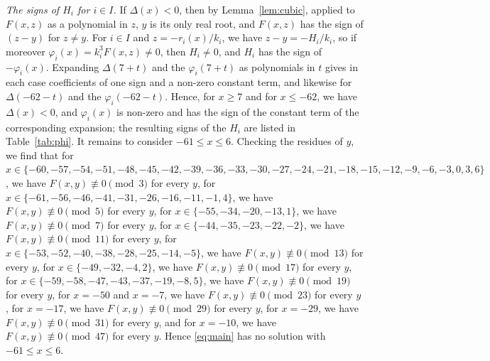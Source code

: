 \documentclass[11pt]{article}
\begin{document}
\emph{The signs of $H_i$ for $i\in I$.} If $\Delta(x)<0$, then by Lemma~\ref{lem:cubic}, applied to $F(x,z)$ as a polynomial in $z$, $y$ is its only real root, and $F(x,z)$ has the sign of $(z-y)$ for $z\neq y$. For $i\in I$ and $z=-r_i(x)/k_i$, we have $z-y=-H_i/k_i$, so if moreover $\varphi_i(x)=k_i^3F(x,z)\neq0$, then $H_i\neq0$, and $H_i$ has the sign of $-\varphi_i(x)$. Expanding $\Delta(7+t)$ and the $\varphi_i(7+t)$ as polynomials in $t$ gives in each case coefficients of one sign and a non-zero constant term, and likewise for $\Delta(-62-t)$ and the $\varphi_i(-62-t)$. Hence, for $x\geq7$ and for $x\leq-62$, we have $\Delta(x)<0$, and $\varphi_i(x)$ is non-zero and has the sign of the constant term of the corresponding expansion; the resulting signs of the $H_i$ are listed in Table~\ref{tab:phi}. It remains to consider $-61\leq x\leq6$. Checking the residues of $y$, we find that for $x\in\{-60,\allowbreak -57,\allowbreak -54,\allowbreak -51,\allowbreak -48,\allowbreak -45,\allowbreak -42,\allowbreak -39,\allowbreak -36,\allowbreak -33,\allowbreak -30,\allowbreak -27,\allowbreak -24,\allowbreak -21,\allowbreak -18,\allowbreak -15,\allowbreak -12,\allowbreak -9,\allowbreak -6,\allowbreak -3,\allowbreak 0,\allowbreak 3,\allowbreak 6\}$, we have $F(x,y)\not\equiv0\pmod{3}$ for every $y$, for $x\in\{-61,\allowbreak -56,\allowbreak -46,\allowbreak -41,\allowbreak -31,\allowbreak -26,\allowbreak -16,\allowbreak -11,\allowbreak -1,\allowbreak 4\}$, we have $F(x,y)\not\equiv0\pmod{5}$ for every $y$, for $x\in\{-55,\allowbreak -34,\allowbreak -20,\allowbreak -13,\allowbreak 1\}$, we have $F(x,y)\not\equiv0\pmod{7}$ for every $y$, for $x\in\{-44,\allowbreak -35,\allowbreak -23,\allowbreak -22,\allowbreak -2\}$, we have $F(x,y)\not\equiv0\pmod{11}$ for every $y$, for $x\in\{-53,\allowbreak -52,\allowbreak -40,\allowbreak -38,\allowbreak -28,\allowbreak -25,\allowbreak -14,\allowbreak -5\}$, we have $F(x,y)\not\equiv0\pmod{13}$ for every $y$, for $x\in\{-49,\allowbreak -32,\allowbreak -4,\allowbreak 2\}$, we have $F(x,y)\not\equiv0\pmod{17}$ for every $y$, for $x\in\{-59,\allowbreak -58,\allowbreak -47,\allowbreak -43,\allowbreak -37,\allowbreak -19,\allowbreak -8,\allowbreak 5\}$, we have $F(x,y)\not\equiv0\pmod{19}$ for every $y$, for $x=-50$ and $x=-7$, we have $F(x,y)\not\equiv0\pmod{23}$ for every $y$, for $x=-17$, we have $F(x,y)\not\equiv0\pmod{29}$ for every $y$, for $x=-29$, we have $F(x,y)\not\equiv0\pmod{31}$ for every $y$, and for $x=-10$, we have $F(x,y)\not\equiv0\pmod{47}$ for every $y$. Hence \eqref{eq:main} has no solution with $-61\leq x\leq6$.
\end{document}
